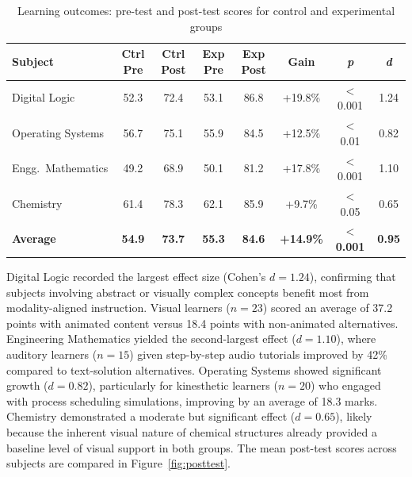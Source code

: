 \begin{table}[htb]
	\fontsize{10}{12}\selectfont
	\centering
	\caption{Learning outcomes: pre-test and post-test scores for control and experimental groups}
	\label{tab:outcomes}
	\begin{tabular}{|p{3.2cm}|c|c|c|c|c|c|c|}
		\hline
		\textbf{Subject} & \textbf{Ctrl Pre} & \textbf{Ctrl Post} & \textbf{Exp Pre} & \textbf{Exp Post} & \textbf{Gain} & \textbf{\textit{p}} & \textbf{\textit{d}} \\
		\hline
		Digital Logic     & 52.3 & 72.4 & 53.1 & 86.8 & +19.8\% & $<$0.001 & 1.24 \\
		\hline
		Operating Systems & 56.7 & 75.1 & 55.9 & 84.5 & +12.5\% & $<$0.01  & 0.82 \\
		\hline
		Engg.\ Mathematics & 49.2 & 68.9 & 50.1 & 81.2 & +17.8\% & $<$0.001 & 1.10 \\
		\hline
		Chemistry         & 61.4 & 78.3 & 62.1 & 85.9 & +9.7\%  & $<$0.05  & 0.65 \\
		\hline
		\textbf{Average}  & \textbf{54.9} & \textbf{73.7} & \textbf{55.3} & \textbf{84.6} & \textbf{+14.9\%} & $<$\textbf{0.001} & \textbf{0.95} \\
		\hline
	\end{tabular}
\end{table}

Digital Logic recorded the largest effect size (Cohen's $d = 1.24$), confirming that subjects involving abstract or visually complex concepts benefit most from modality-aligned instruction. Visual learners ($n = 23$) scored an average of 37.2 points with animated content versus 18.4 points with non-animated alternatives. Engineering Mathematics yielded the second-largest effect ($d = 1.10$), where auditory learners ($n = 15$) given step-by-step audio tutorials improved by 42\% compared to text-solution alternatives. Operating Systems showed significant growth ($d = 0.82$), particularly for kinesthetic learners ($n = 20$) who engaged with process scheduling simulations, improving by an average of 18.3 marks. Chemistry demonstrated a moderate but significant effect ($d = 0.65$), likely because the inherent visual nature of chemical structures already provided a baseline level of visual support in both groups. The mean post-test scores across subjects are compared in Figure~\ref{fig:posttest}.

